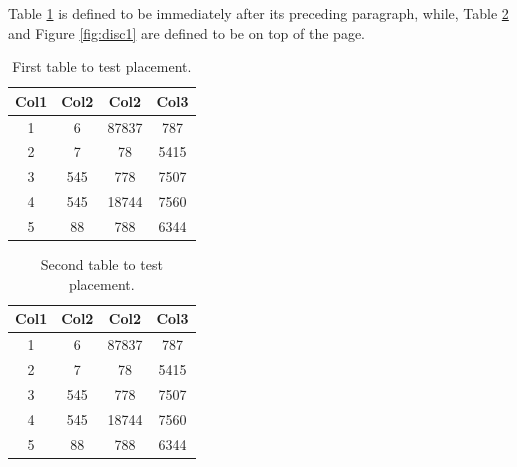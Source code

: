 
Table \ref{table:1} is defined to be immediately after its preceding paragraph, while, Table \ref{table:2} and Figure \ref{fig:disc1} are defined to be on top of the page.

\begin{table}
    \caption{First table to test placement.}
    \label{table:1}
    \begin{tabular}{|c c c c|}
     \hline
     Col1 & Col2 & Col2 & Col3 \\ [0.5ex]
     \hline\hline
     1 & 6 & 87837 & 787 \\
     2 & 7 & 78 & 5415 \\
     3 & 545 & 778 & 7507 \\
     4 & 545 & 18744 & 7560 \\
     5 & 88 & 788 & 6344 \\ [1ex]
     \hline
    \end{tabular}
\end{table}

\begin{table}[!htbp]
    \caption{Second table to test placement.}
    \label{table:2}
    \begin{tabular}{|c c c c|}
     \hline
     Col1 & Col2 & Col2 & Col3 \\ [0.5ex]
     \hline\hline
     1 & 6 & 87837 & 787 \\
     2 & 7 & 78 & 5415 \\
     3 & 545 & 778 & 7507 \\
     4 & 545 & 18744 & 7560 \\
     5 & 88 & 788 & 6344 \\ [1ex]
     \hline
    \end{tabular}
\end{table}

